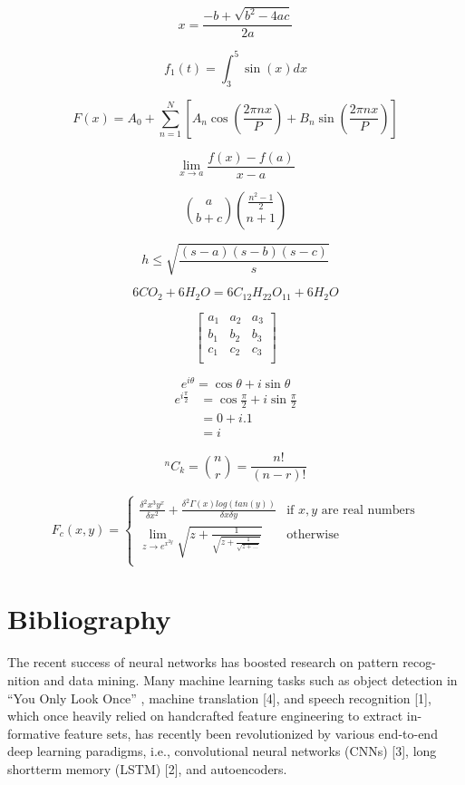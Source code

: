 \documentclass[12pt, a4paper]{article} %
\begin{document}
$$x = \frac{-b + \sqrt{b^2 - 4ac}}{2a}$$

$$f_1(t) = \int_{3}^{5}\sin (x)dx$$

$$F(x) = A_0 + \displaystyle\sum_{n=1}^{N}\left[A_n\cos \left(\frac{2\pi nx}{P}\right) + B_n\sin \left(\frac{2 \pi nx}{P} \right) \right]$$

$$\lim\limits_{x \to a}\frac{f(x)-f(a)}{x-a}$$

$$\binom{a}{b+c} \binom{\frac{n^2-1}{2}}{n+1}$$

$$h \leq \sqrt{\frac{(s-a)(s-b)(s-c)}{s}}$$
	
$$6CO_2 + 6H_2O = 6C_12H_22O_11 + 6H_2O$$	
	
$$
\left[
\begin{matrix}
	a_1 & a_2 & a_3\\
	b_1 & b_2 & b_3\\
	c_1 & c_2 & c_3\\
\end{matrix}
\right]
$$

$$
e^{i\theta} = \cos \theta + i\sin \theta 
$$
\begin{equation*}
	\begin{split} 
		e^{i\frac{\pi}{2}} &= \cos \frac{\pi}{2} + i\sin \frac{\pi}{2}\\
		& = 0 + i.1\\
		& = i
\end{split}		
\end{equation*}

$$
 {}^{n}C_{k} = {n \choose r} = \frac{n!}{(n-r)!}
$$

$$
F_c(x,y) = \begin{cases}
	\frac{\delta^2x^3y^x}{\delta x^2} + 
	\frac{\delta^2\Gamma(x)log(tan(y))}{\delta x\delta y} & 
	\text{if } x,y 
	\text{ are real numbers}\\
	\lim\limits_{z \to e^{x^{2y}}}\sqrt{z+\frac{1}{\sqrt{z+\frac{1}{\sqrt{z+\hdots}}}}}&
	
	\text{otherwise}\\
\end{cases}
$$


\section{Bibliography}
The recent success of neural networks has boosted research on pattern recog-
nition and data mining. Many machine learning tasks such as object detection
in “You Only Look Once” \cite{redmon2016you}, machine translation [4], and speech recognition
[1], which once heavily relied on handcrafted feature engineering to extract in-
formative feature sets, has recently been revolutionized by various end-to-end
deep learning paradigms, i.e., convolutional neural networks (CNNs) [3], long
shortterm memory (LSTM) [2], and autoencoders.

	

\printbibliography
\end{document}
